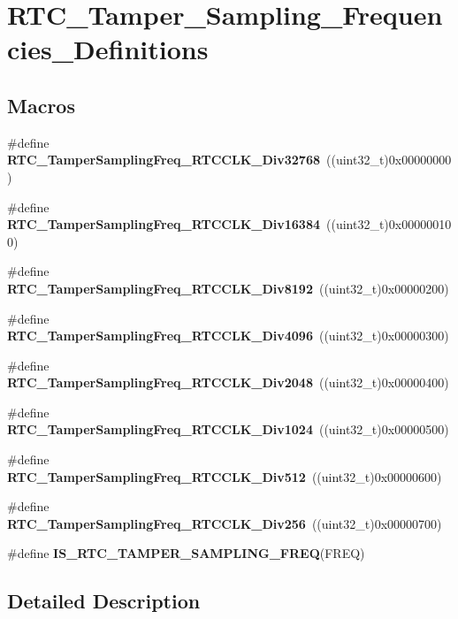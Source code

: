 \section{R\+T\+C\+\_\+\+Tamper\+\_\+\+Sampling\+\_\+\+Frequencies\+\_\+\+Definitions}
\label{group__RTC__Tamper__Sampling__Frequencies__Definitions}
\subsection*{Macros}
\begin{DoxyCompactItemize}
\item 
\#define \textbf{ R\+T\+C\+\_\+\+Tamper\+Sampling\+Freq\+\_\+\+R\+T\+C\+C\+L\+K\+\_\+\+Div32768}~((uint32\+\_\+t)0x00000000)
\item 
\#define \textbf{ R\+T\+C\+\_\+\+Tamper\+Sampling\+Freq\+\_\+\+R\+T\+C\+C\+L\+K\+\_\+\+Div16384}~((uint32\+\_\+t)0x000000100)
\item 
\#define \textbf{ R\+T\+C\+\_\+\+Tamper\+Sampling\+Freq\+\_\+\+R\+T\+C\+C\+L\+K\+\_\+\+Div8192}~((uint32\+\_\+t)0x00000200)
\item 
\#define \textbf{ R\+T\+C\+\_\+\+Tamper\+Sampling\+Freq\+\_\+\+R\+T\+C\+C\+L\+K\+\_\+\+Div4096}~((uint32\+\_\+t)0x00000300)
\item 
\#define \textbf{ R\+T\+C\+\_\+\+Tamper\+Sampling\+Freq\+\_\+\+R\+T\+C\+C\+L\+K\+\_\+\+Div2048}~((uint32\+\_\+t)0x00000400)
\item 
\#define \textbf{ R\+T\+C\+\_\+\+Tamper\+Sampling\+Freq\+\_\+\+R\+T\+C\+C\+L\+K\+\_\+\+Div1024}~((uint32\+\_\+t)0x00000500)
\item 
\#define \textbf{ R\+T\+C\+\_\+\+Tamper\+Sampling\+Freq\+\_\+\+R\+T\+C\+C\+L\+K\+\_\+\+Div512}~((uint32\+\_\+t)0x00000600)
\item 
\#define \textbf{ R\+T\+C\+\_\+\+Tamper\+Sampling\+Freq\+\_\+\+R\+T\+C\+C\+L\+K\+\_\+\+Div256}~((uint32\+\_\+t)0x00000700)
\item 
\#define \textbf{ I\+S\+\_\+\+R\+T\+C\+\_\+\+T\+A\+M\+P\+E\+R\+\_\+\+S\+A\+M\+P\+L\+I\+N\+G\+\_\+\+F\+R\+EQ}(F\+R\+EQ)
\end{DoxyCompactItemize}


\subsection{Detailed Description}



